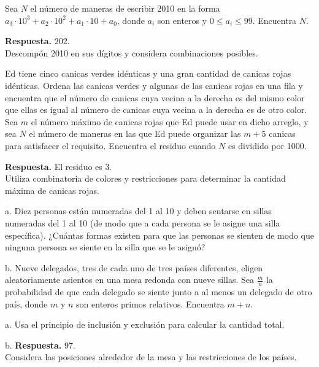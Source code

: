 \documentclass[11pt]{scrartcl}
\begin{document}
\begin{problem}[AIME 2010]
Sea \( N \) el número de maneras de escribir 2010 en la forma \( a_3 \cdot 10^3 + a_2 \cdot 10^2 + a_1 \cdot 10 + a_0 \), donde \( a_i \) son enteros y \( 0 \leq a_i \leq 99 \). Encuentra \( N \).
\begin{hint}
\textbf{Respuesta.} \( 202 \).\\

Descompón 2010 en sus dígitos y considera combinaciones posibles.
\end{hint}
\end{problem}

\begin{problem}[AIME 2011]
Ed tiene cinco canicas verdes idénticas y una gran cantidad de canicas rojas idénticas. Ordena las canicas verdes y algunas de las canicas rojas en una fila y encuentra que el número de canicas cuya vecina a la derecha es del mismo color que ellas es igual al número de canicas cuya vecina a la derecha es de otro color. Sea \( m \) el número máximo de canicas rojas que Ed puede usar en dicho arreglo, y sea \( N \) el número de maneras en las que Ed puede organizar las \( m + 5 \) canicas para satisfacer el requisito. Encuentra el residuo cuando \( N \) es dividido por 1000.
\begin{hint}
\textbf{Respuesta.} El residuo es \( 3 \).\\

Utiliza combinatoria de colores y restricciones para determinar la cantidad máxima de canicas rojas.
\end{hint}
\end{problem}

\begin{problem}[AIME 2011]
a. Diez personas están numeradas del 1 al 10 y deben sentarse en sillas numeradas del 1 al 10 (de modo que a cada persona se le asigne una silla específica). ¿Cuántas formas existen para que las personas se sienten de modo que ninguna persona se siente en la silla que se le asignó?

b. Nueve delegados, tres de cada uno de tres países diferentes, eligen aleatoriamente asientos en una mesa redonda con nueve sillas. Sea \( \frac{m}{n} \) la probabilidad de que cada delegado se siente junto a al menos un delegado de otro país, donde \( m \) y \( n \) son enteros primos relativos. Encuentra \( m + n \).
\begin{hint}
a. Usa el principio de inclusión y exclusión para calcular la cantidad total.

b. \textbf{Respuesta.} \( 97 \).\\
Considera las posiciones alrededor de la mesa y las restricciones de los países.
\end{hint}
\end{problem}
\end{document}

